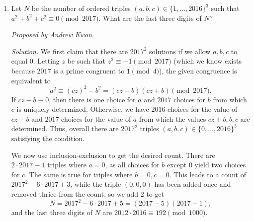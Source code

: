 \documentclass[10pt]{article}
\newcommand{\proposed}[1]
{
\vspace{5pt}
\noindent\textit{Proposed by #1}
}
\newcommand{\solution}
{
\vspace{5pt}
\noindent\textit{Solution.}\qquad
}
\begin{document}
\begin{enumerate}
\begin{proof}
\end{proof}

Going back to the original problem, note that $D(N) = N$ implies that \[p_1^{a_1}\cdots p_k^{a_k}\left(\dfrac{a_1}{p_1}+\cdots+\dfrac{a_k}{p_k}\right) = p_1^{a_1}\cdots p_k^{a_k}\quad\implies\quad \dfrac{a_1}{p_1}+\cdots+\dfrac{a_k}{p_k} = 1.\] Multiplying both sides by $p_1\cdots p_k$ yields \[\dfrac{a_1p_1\cdots p_k}{p_1}+\cdots+\dfrac{a_kp_1\cdots p_k}{p_k} = p_1\cdots p_k.\] Now take both sides modulo $p_1$.  All but the first term goes away and so we are left with \[a_1p_2\cdots p_k \equiv 0\pmod{p_1}.\] Thus $p_1\mid a_1$.  However, since \[\dfrac{a_1}{p_1}+\cdots+\dfrac{a_k}{p_k} = 1,\] the ratio $\tfrac{a_1}{p_1}$ cannot exceed $1$.  Hence we in fact have equality, meaning that $p_1=a_1$ and $a_j=0$ for all $2\leq j\leq k$.  It follows that $N=p^p$ for prime $p$.  Since $5^5>1000$, the answer is simply $2^2+3^3=\boxed{31}$.

\item Let $N$ be the number of ordered triples $(a,b,c) \in \{1, \ldots, 2016\}^{3}$ such that $a^{2} + b^{2} + c^{2} \equiv 0 \pmod{2017}$. What are the last three digits of $N$?
	
	\proposed{Andrew Kwon}
	
	\solution We first claim that there are $2017^{2}$ solutions if we allow $a,b,c$ to equal 0. Letting $z$ be such that $z^{2} \equiv -1 \pmod{2017}$ (which we know exists because $2017$ is a prime congruent to $1\pmod 4$), the given congruence is equivalent to \[a^{2} \equiv (cz)^{2} - b^{2} = (cz - b)(cz+b) \pmod{2017}.\] If $cz - b \equiv 0$, then there is one choice for $a$ and $2017$ choices for $b$ from which $c$ is uniquely determined. Otherwise, we have $2016$ choices for the value of $cz-b$ and $2017$ choices for the value of $a$ from which the values $cz+b, b, c$ are determined. Thus, overall there are $2017^{2}$ triples $(a,b,c) \in \{0, \ldots, 2016\}^{3}$ satisfying the condition.

	\par We now use inclusion-exclusion to get the desired count. There are $2 \cdot 2017- 1$ triples where $a = 0$, as all choices for $b$ except $0$ yield two choices for $c$. The same is true for triples where $b = 0, c= 0$. This leads to a count of $2017^{2} - 6 \cdot 2017 + 3$, while the triple $(0,0,0)$ has been added once and removed thrice from the count, so we add 2 to get \[N = 2017^{2} - 6 \cdot 2017 + 5 = (2017 - 5)(2017 - 1),\] and the last three digits of $N$ are $2012 \cdot 2016 \equiv  \boxed{192} \pmod{1000}$.
	

\end{enumerate}
\end{document}
